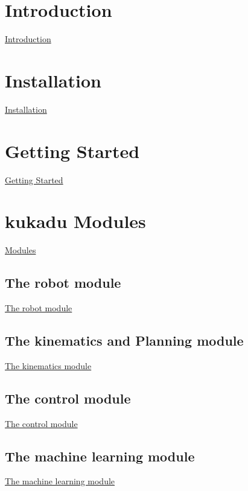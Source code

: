 \hypertarget{index_introduction}{}\section{Introduction}\label{index_introduction}
\hyperlink{introductionpage}{Introduction} \hypertarget{index_installation}{}\section{Installation}\label{index_installation}
\hyperlink{installationpage}{Installation} \hypertarget{index_gettingstarted}{}\section{Getting Started}\label{index_gettingstarted}
\hyperlink{gettingstartedpage}{Getting Started} \hypertarget{index_modules}{}\section{kukadu Modules}\label{index_modules}
\hyperlink{modulespage}{Modules} \hypertarget{index_robot}{}\subsection{The robot module}\label{index_robot}
\hyperlink{robotpage}{The robot module} \hypertarget{index_kinematics}{}\subsection{The kinematics and Planning module}\label{index_kinematics}
\hyperlink{kinematicspage}{The kinematics module} \hypertarget{index_control}{}\subsection{The control module}\label{index_control}
\hyperlink{controlpage}{The control module} \hypertarget{index_ml}{}\subsection{The machine learning module}\label{index_ml}
\hyperlink{mlpage}{The machine learning module} 